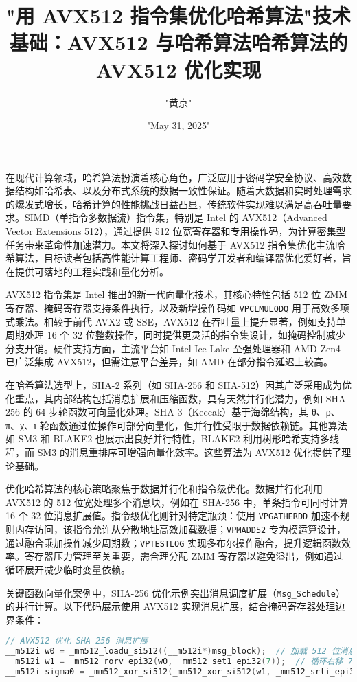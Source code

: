 \title{"用 AVX512 指令集优化哈希算法"}
\author{"黄京"}
\date{"May 31, 2025"}
\maketitle
在现代计算领域，哈希算法扮演着核心角色，广泛应用于密码学安全协议、高效数据结构如哈希表、以及分布式系统的数据一致性保证。随着大数据和实时处理需求的爆发式增长，哈希计算的性能挑战日益凸显，传统软件实现难以满足高吞吐量要求。SIMD（单指令多数据流）指令集，特别是 Intel 的 AVX512（Advanced Vector Extensions 512），通过提供 512 位宽寄存器和专用操作码，为计算密集型任务带来革命性加速潜力。本文将深入探讨如何基于 AVX512 指令集优化主流哈希算法，目标读者包括高性能计算工程师、密码学开发者和编译器优化爱好者，旨在提供可落地的工程实践和量化分析。\par
\title{技术基础：AVX512 与哈希算法}
AVX512 指令集是 Intel 推出的新一代向量化技术，其核心特性包括 512 位 ZMM 寄存器、掩码寄存器支持条件执行，以及新增操作码如 \texttt{VPCLMULQDQ} 用于高效多项式乘法。相较于前代 AVX2 或 SSE，AVX512 在吞吐量上提升显著，例如支持单周期处理 16 个 32 位整数操作，同时提供更灵活的指令集设计，如掩码控制减少分支开销。硬件支持方面，主流平台如 Intel Ice Lake 至强处理器和 AMD Zen4 已广泛集成 AVX512，但需注意平台差异，如 AMD 在部分指令延迟上较高。\par
在哈希算法选型上，SHA-2 系列（如 SHA-256 和 SHA-512）因其广泛采用成为优化重点，其内部结构包括消息扩展和压缩函数，具有天然并行化潜力，例如 SHA-256 的 64 步轮函数可向量化处理。SHA-3（Keccak）基于海绵结构，其 θ、ρ、π、χ、ι 轮函数通过位操作可部分向量化，但并行性受限于数据依赖链。其他算法如 SM3 和 BLAKE2 也展示出良好并行特性，BLAKE2 利用树形哈希支持多线程，而 SM3 的消息重排序可增强向量化效率。这些算法为 AVX512 优化提供了理论基础。\par
\title{哈希算法的 AVX512 优化实现}
优化哈希算法的核心策略聚焦于数据并行化和指令级优化。数据并行化利用 AVX512 的 512 位宽处理多个消息块，例如在 SHA-256 中，单条指令可同时计算 16 个 32 位消息扩展值。指令级优化则针对特定瓶颈：使用 \texttt{VPGATHERDD} 加速不规则内存访问，该指令允许从分散地址高效加载数据；\texttt{VPMADD52} 专为模运算设计，通过融合乘加操作减少周期数；\texttt{VPTESTLOG} 实现多布尔操作融合，提升逻辑函数效率。寄存器压力管理至关重要，需合理分配 ZMM 寄存器以避免溢出，例如通过循环展开减少临时变量依赖。\par
关键函数向量化案例中，SHA-256 优化示例突出消息调度扩展（\texttt{Msg\_{}Schedule}）的并行计算。以下代码展示使用 AVX512 实现消息扩展，结合掩码寄存器处理边界条件：\par
\begin{lstlisting}[language=c]
// AVX512 优化 SHA-256 消息扩展
__m512i w0 = _mm512_loadu_si512((__m512i*)msg_block);  // 加载 512 位消息块
__m512i w1 = _mm512_rorv_epi32(w0, _mm512_set1_epi32(7));  // 循环右移 7 位
__m512i sigma0 = _mm512_xor_si512(_mm512_xor_si512(w1, _mm512_srli_epi32(w0, 3)), _mm512_slli_epi32(w0, 14));  // σ 0 函数计算
\end{lstlisting}
